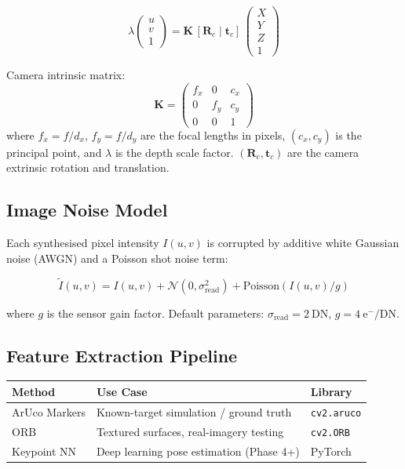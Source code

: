 \documentclass[12pt, a4paper]{article}
\begin{document}
\begin{formulabox}[title=Pinhole Projection]
\begin{equation}
\lambda \begin{pmatrix} u \\ v \\ 1 \end{pmatrix}
= \mathbf{K}\, [\mathbf{R}_c \mid \mathbf{t}_c]\,
\begin{pmatrix} X \\ Y \\ Z \\ 1 \end{pmatrix}
\end{equation}

Camera intrinsic matrix:
\begin{equation}
\mathbf{K} =
\begin{pmatrix}
f_x & 0   & c_x \\
0   & f_y & c_y \\
0   & 0   & 1
\end{pmatrix}
\end{equation}
where $f_x = f/d_x$, $f_y = f/d_y$ are the focal lengths in pixels,
$(c_x, c_y)$ is the principal point, and $\lambda$ is the depth scale
factor. $(\mathbf{R}_c, \mathbf{t}_c)$ are the camera extrinsic rotation
and translation.
\end{formulabox}

\subsection{Image Noise Model}

Each synthesised pixel intensity $I(u,v)$ is corrupted by additive white
Gaussian noise (AWGN) and a Poisson shot noise term:

\begin{equation}
\tilde{I}(u,v) = I(u,v) + \mathcal{N}(0, \sigma_{\mathrm{read}}^2)
+ \mathrm{Poisson}(I(u,v)/g)
\end{equation}

where $g$ is the sensor gain factor. Default parameters: $\sigma_{\mathrm{read}}
= 2\ \mathrm{DN}$, $g = 4\ \mathrm{e^-/DN}$.

\subsection{Feature Extraction Pipeline}

\begin{center}
\begin{tabular}{lll}
\toprule
\textbf{Method} & \textbf{Use Case} & \textbf{Library} \\
\midrule
ArUco Markers   & Known-target simulation / ground truth & \texttt{cv2.aruco} \\
ORB             & Textured surfaces, real-imagery testing & \texttt{cv2.ORB} \\
Keypoint NN     & Deep learning pose estimation (Phase 4+) & PyTorch \\
\bottomrule
\end{tabular}
\end{center}
\end{document}
